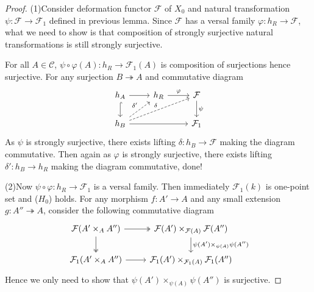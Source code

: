 \documentclass{ctexart}
\begin{document}
\begin{proof}
    (1)Consider deformation functor $\mathcal{F}$ of $X_{0}$ and natural transformation $\psi: \mathcal{F} \rightarrow \mathcal{F}_{1}$ defined in previous lemma.
    Since $\mathcal{F}$ has a versal family $\varphi: h_{R} \rightarrow \mathcal{F}$, 
    what we need to show is that composition of strongly surjective natural transformations is still strongly surjective.
    \par
    For all $A\in \mathcal{C}$, $\psi \circ \varphi(A): h_{R} \rightarrow \mathcal{F}_{1}(A)$ is composition of surjections hence surjective.
    For any surjection $B \twoheadrightarrow A$ and commutative diagram
    \begin{equation}
        \begin{tikzcd}
            h_{A} \arrow[r] \arrow[d, hookrightarrow] &
            h_{R} \arrow[r, "\varphi"] & 
            \mathcal{F} \arrow[d, "\psi"] \\
            h_{B} \arrow[ur, dashrightarrow, "{\delta'}"] \arrow[urr, dashrightarrow, "\delta"] \arrow[rr] &&
            \mathcal{F}_{1}
        \end{tikzcd}
    \end{equation}
    As $\psi$ is strongly surjective, there exists lifting $\delta: h_{B} \rightarrow \mathcal{F}$ making the diagram commutative.
    Then again as $\varphi$ is strongly surjective, there exists lifting $\delta': h_{B} \rightarrow h_{R}$ making the diagram commutative, done!
    \par
    (2)Now $\psi \circ \varphi: h_{R} \rightarrow \mathcal{F}_{1}$ is a versal family.
    Then immediately $\mathcal{F}_{1}(k)$ is one-point set and ($H_{0}$) holds.
    For any morphism $f: A' \rightarrow A$ and any small extension $g: A'' \twoheadrightarrow A$, consider the following commutative diagram
    \begin{equation}
        \begin{tikzcd}
            \mathcal{F}(A' \times_{A} A'') \arrow[r, twoheadrightarrow] \arrow[d, twoheadrightarrow] &
            \mathcal{F}(A') \times_{\mathcal{F}(A)} \mathcal{F}(A'') \arrow[d, "{\psi(A') \times_{\psi(A)} \psi(A'')}"] \\
            \mathcal{F}_{1}(A' \times_{A} A'') \arrow[r] &
            \mathcal{F}_{1}(A') \times_{\mathcal{F}_{1}(A)} \mathcal{F}_{1}(A'')
        \end{tikzcd}
    \end{equation}
    Hence we only need to show that $\psi(A') \times_{\psi(A)} \psi(A'')$ is surjective.

\end{proof}
\end{document}
